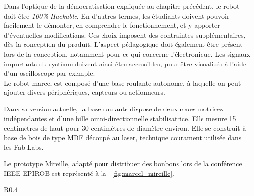 \documentclass[a4paper,12pt]{report}
\newcommand{\figpath}{figures}
\begin{document}
Dans l'optique de la démocratisation expliquée au chapitre précédent, le robot doit être \emph{100\% Hackable}.
En d'autres termes, les étudiants doivent pouvoir facilement le démonter, en comprendre le fonctionnement, et y apporter d'éventuelles modifications.
Ces choix imposent des contraintes supplémentaires, dès la conception du produit.
L'aspect pédagogique doit également être présent lors de la conception, notamment pour ce qui concerne l'électronique.
Les signaux importants du système doivent ainsi être accessibles, pour être visualisés à l'aide d'un oscilloscope par exemple.\\


Le robot marcel est composé d'une base roulante autonome, à laquelle on peut ajouter divers périphériques, capteurs ou actionneurs.

Dans sa version actuelle, la base roulante dispose de deux roues motrices indépendantes et d'une bille omni-directionnelle stabilisatrice.
Elle mesure 15 centimètres de haut pour 30 centimètres de diamètre environ.
Elle se construit à base de bois de type MDF découpé au laser, technique courament utilisée dans les Fab Labs.

Le prototype \og{}Mireille\fg{}, adapté pour distribuer des bonbons lors de la conférence IEEE-EPIROB est représenté à la \figurename~\ref{fig:marcel_mireille}.



\begin{wrapfigure}{R}{0.4\textwidth}
	\centering
	\caption{\label{fig:marcel_mireille}Base roulante Marcel : Prototye \og{}Mireille\fg{}.}
\end{wrapfigure}


\end{document}
